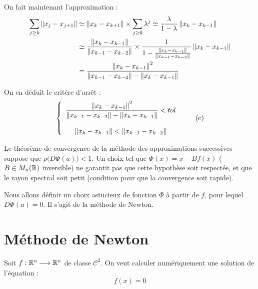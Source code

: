 \begin{enumerate}[label=\alph*)]
        On fait maintenant l'approximation :
        \begin{align*}
            \sum_{j \geq k} \left\lVert x_j - x_{j+1}\right\rVert & \simeq \left\lVert x_k - x_{k+1}\right\rVert \times \sum_{j \geq 0} \lambda ^j \simeq \frac{\lambda}{1 - \lambda} \left\lVert x_k - x_{k-1}\right\rVert \\
            & \simeq \frac{\left\lVert x_k - x_{k-1}\right\rVert}{\left\lVert x_{k-1} - x_{k-2}\right\rVert} \times \frac{1}{1-\frac{\left\lVert x_k - x_{k-1}\right\rVert}{\left\lVert x_{k-1}-x_{k-2}\right\rVert}} \left\lVert x_k - x_{k-1}\right\rVert \\
            & = \frac{\left\lVert x_k - x_{k-1}\right\rVert^2}{\left\lVert x_{k-1} - x_{k-2}\right\rVert - \left\lVert x_k - x_{k-1}\right\rVert}
        \end{align*}

        On en déduit le critère d'arrêt :
        \begin{equation*}
            \left\lbrace
            \begin{array}{c}
                \displaystyle\frac{\left\lVert x_k - x_{k-1}\right\rVert^2}{\left\lVert x_{k-1} - x_{k-2}\right\rVert - \left\lVert x_k - x_{k-1}\right\rVert} < tol \\
                \\
                \left\lVert x_k - x_{k-1}\right\rVert < \left\lVert x_{k-1} - x_{k-2}\right\rVert
            \end{array}
            \right.
            \tag{c}
        \end{equation*}
\end{enumerate}


        Le théorème de convergence de la méthode des approximations successives suppose que $\rho \big( D\Phi(a) \big) < 1$. 
        Un choix tel que $\Phi(x) = x - B f(x)$ ($B \in M_n(\mathbb{R})$ inversible) ne garantit pas
        que cette hypothèse soit respectée, et que le rayon spectral soit petit 
        (condition pour que la convergence soit rapide).

        Nous allons définir un choix astucieux de fonction $\Phi$ à partir de $f$, pour
        lequel $D\Phi(a) = 0$. Il s'agit de la méthode de Newton.

\section{Méthode de Newton}

    Soit $f : \mathbb{R}^n \longrightarrow \mathbb{R}^n$ de classe $\mathcal{C}^2$. On veut calculer
    numériquement une solution de l'équation :
    \begin{equation}
        f(x) = 0
    \end{equation}

